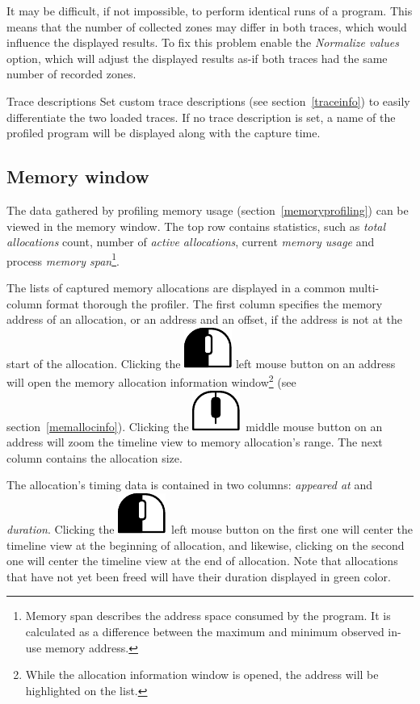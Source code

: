 \documentclass[hidelinks,titlepage,a4paper]{article}
\newcommand{\LMB}{\includegraphics[height=.8\baselineskip]{icons/lmb}}
\newcommand{\MMB}{\includegraphics[height=.8\baselineskip]{icons/mmb}}
\begin{document}
It may be difficult, if not impossible, to perform identical runs of a program. This means that the number of collected zones may differ in both traces, which would influence the displayed results. To fix this problem enable the \emph{Normalize values} option, which will adjust the displayed results as-if both traces had the same number of recorded zones.

\begin{bclogo}[
noborder=true,
couleur=black!5,
logo=\bclampe
]{Trace descriptions}
Set custom trace descriptions (see section~\ref{traceinfo}) to easily differentiate the two loaded traces. If no trace description is set, a name of the profiled program will be displayed along with the capture time.
\end{bclogo}

\subsection{Memory window}
\label{memorywindow}

The data gathered by profiling memory usage (section~\ref{memoryprofiling}) can be viewed in the memory window. The top row contains statistics, such as \emph{total allocations} count, number of \emph{active allocations}, current \emph{memory usage} and process \emph{memory span}\footnote{Memory span describes the address space consumed by the program. It is calculated as a difference between the maximum and minimum observed in-use memory address.}.

The lists of captured memory allocations are displayed in a common multi-column format thorough the profiler. The first column specifies the memory address of an allocation, or an address and an offset, if the address is not at the start of the allocation. Clicking the \LMB{} left mouse button on an address will open the memory allocation information window\footnote{While the allocation information window is opened, the address will be highlighted on the list.} (see section~\ref{memallocinfo}). Clicking the \MMB{}~middle mouse button on an address will zoom the timeline view to memory allocation's range. The next column contains the allocation size.

The allocation's timing data is contained in two columns: \emph{appeared at} and \emph{duration}. Clicking the \LMB{}~left mouse button on the first one will center the timeline view at the beginning of allocation, and likewise, clicking on the second one will center the timeline view at the end of allocation. Note that allocations that have not yet been freed will have their duration displayed in green color.
\end{document}
